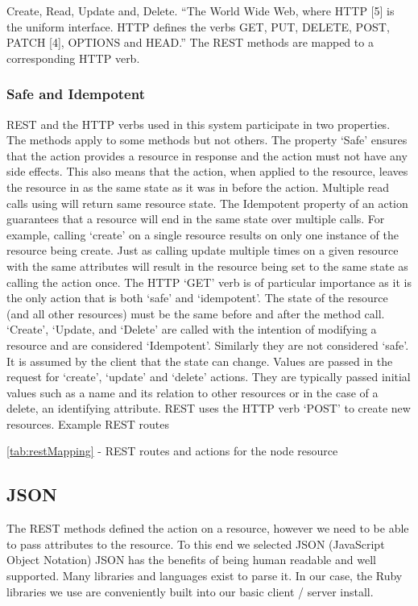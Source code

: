     Create, Read, Update and, Delete.  
     “The World Wide Web, where HTTP [5] is the uniform interface. HTTP defines the verbs GET, PUT, DELETE, POST, PATCH [4], OPTIONS and HEAD.” 
      The REST methods are mapped to a corresponding HTTP verb.  \cite{Fielding:2000dd}


\subsubsection{Safe and Idempotent}
REST and the HTTP verbs used in this system participate in two properties. The methods apply to some methods but not others.  The property ‘Safe’ ensures that the action provides a resource in response and the action must not have any side effects. This also means that the action, when applied to the resource, leaves the resource in as the same state as it was in before the action.  Multiple read calls using will return same resource state.  
The Idempotent property of an action guarantees that a resource will end in the same state over multiple calls. For example, calling ‘create’ on a single resource results on only one instance of the resource being create.  Just as calling update multiple times on a given resource with the same attributes will result in the resource being set to the same state as calling the action once.  The HTTP ‘GET’ verb is of particular importance as it is the only action that is both ‘safe’ and ‘idempotent’.  
The state of the resource (and all other resources) must be the same before and after the method call.  ‘Create’, ‘Update, and ‘Delete’ are called with the intention of modifying a resource and are considered ‘Idempotent’.  Similarly they are not considered ‘safe’.  It is assumed by the client that the state can change.  
Values are passed in the request for ‘create’, ‘update’ and ‘delete’ actions.  They are typically passed initial values such as a name and its relation to other resources or in the case of a delete, an identifying attribute.  REST uses the HTTP verb ‘POST’ to create new resources.  
       Example REST routes
        
\autoref{tab:restMapping} - REST routes and actions for the node resource

\subsection{JSON}
The REST methods defined the action on a resource, however we need to be able to pass attributes to the resource. To this end we selected JSON (JavaScript Object Notation)\cite{Bray:1aMFfDtC} JSON has the benefits of being human readable and well supported. Many libraries and languages exist to parse it. In our case, the Ruby libraries we use are conveniently built into our basic client / server install.  